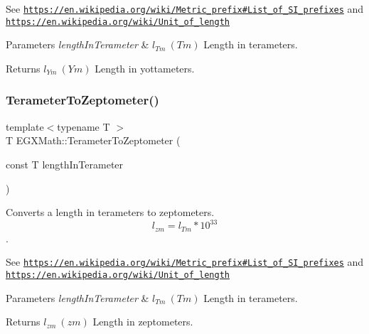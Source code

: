 See \href{https://en.wikipedia.org/wiki/Metric_prefix#List_of_SI_prefixes}{\tt https\+://en.\+wikipedia.\+org/wiki/\+Metric\+\_\+prefix\#\+List\+\_\+of\+\_\+\+S\+I\+\_\+prefixes} and \href{https://en.wikipedia.org/wiki/Unit_of_length}{\tt https\+://en.\+wikipedia.\+org/wiki/\+Unit\+\_\+of\+\_\+length} 
\begin{DoxyParams}{Parameters}
{\em length\+In\+Terameter} & $ l_{Tm}\ (Tm)$ Length in terameters. \\
\hline
\end{DoxyParams}
\begin{DoxyReturn}{Returns}
$ l_{Ym}\ (Ym)$ Length in yottameters. 
\end{DoxyReturn}
\mbox{\label{group___e_g_x_math-_conversions-_length_conversions-_terameter-_s_i_ga2347b883d209d99cd37a4f273a1c6920}} 
\subsubsection{\texorpdfstring{Terameter\+To\+Zeptometer()}{TerameterToZeptometer()}}
{\footnotesize\ttfamily template$<$typename T $>$ \\
T E\+G\+X\+Math\+::\+Terameter\+To\+Zeptometer (\begin{DoxyParamCaption}\item[{const T}]{length\+In\+Terameter }\end{DoxyParamCaption})}



Converts a length in terameters to zeptometers. \[ l_{zm}=l_{Tm} * 10^{33} \]. 

See \href{https://en.wikipedia.org/wiki/Metric_prefix#List_of_SI_prefixes}{\tt https\+://en.\+wikipedia.\+org/wiki/\+Metric\+\_\+prefix\#\+List\+\_\+of\+\_\+\+S\+I\+\_\+prefixes} and \href{https://en.wikipedia.org/wiki/Unit_of_length}{\tt https\+://en.\+wikipedia.\+org/wiki/\+Unit\+\_\+of\+\_\+length} 
\begin{DoxyParams}{Parameters}
{\em length\+In\+Terameter} & $ l_{Tm}\ (Tm)$ Length in terameters. \\
\hline
\end{DoxyParams}
\begin{DoxyReturn}{Returns}
$ l_{zm}\ (zm)$ Length in zeptometers. 
\end{DoxyReturn}
\mbox{\label{group___e_g_x_math-_conversions-_length_conversions-_terameter-_s_i_gad897b4a8fd5405a7996ae3437194b030}} 
